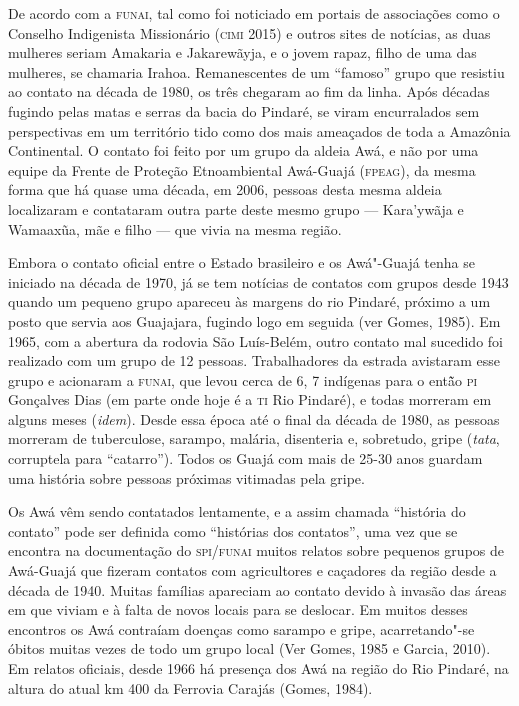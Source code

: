 De acordo com a \textsc{funai}, tal como foi noticiado em portais de associações
como o Conselho Indigenista Missionário (\textsc{cimi} 2015) e outros sites de
notícias, as duas mulheres seriam Amakaria e Jakarewãyja, e o jovem
rapaz, filho de uma das mulheres, se chamaria Irahoa. Remanescentes de
um ``famoso'' grupo que resistiu ao contato na década de 1980, os três
chegaram ao fim da linha. Após décadas fugindo pelas matas e serras da
bacia do Pindaré, se viram encurralados sem perspectivas em um
território tido como dos mais ameaçados de toda a Amazônia Continental.
O contato foi feito por um grupo da aldeia Awá, e não por uma equipe da
Frente de Proteção Etnoambiental Awá-Guajá (\textsc{fpeag}), da mesma forma que
há quase uma década, em 2006, pessoas desta mesma aldeia localizaram e
contataram outra parte deste mesmo grupo --- Kara'ywãja e Wamaaxũa, mãe e
filho --- que vivia na mesma região.

Embora o contato oficial entre o Estado brasileiro e os Awá"-Guajá tenha
se iniciado na década de 1970, já se tem notícias de contatos com grupos
desde 1943 quando um pequeno grupo apareceu às margens do rio Pindaré,
próximo a um posto que servia aos Guajajara, fugindo logo em seguida
(ver Gomes, 1985). Em 1965, com a abertura da rodovia São Luís-Belém,
outro contato mal sucedido foi realizado com um grupo de 12 pessoas.
Trabalhadores da estrada avistaram esse grupo e acionaram a \textsc{funai}, que
levou cerca de 6, 7 indígenas para o entã̃o \textsc{pi} Gonçalves Dias (em parte
onde hoje é a \textsc{ti} Rio Pindaré), e todas morreram em alguns meses (\emph{idem}).
Desde essa época até o final da década de 1980, as pessoas morreram de
tuberculose, sarampo, malária, disenteria e, sobretudo, gripe
(\emph{tata}, corruptela para ``catarro''). Todos os Guajá com mais de
25-30 anos guardam uma história sobre pessoas próximas vitimadas pela
gripe.

Os Awá vêm sendo contatados lentamente, e a assim chamada ``história do
contato'' pode ser definida como ``histórias dos contatos'', uma vez que
se encontra na documentação do \textsc{spi}/\textsc{funai} muitos relatos sobre pequenos
grupos de Awá-Guajá que fizeram contatos com agricultores e caçadores da
região desde a década de 1940. Muitas famílias apareciam ao contato
devido à invasão das áreas em que viviam e à falta de novos locais para
se deslocar. Em muitos desses encontros os Awá contraíam doenças como
sarampo e gripe, acarretando"-se óbitos muitas vezes de todo um grupo
local (Ver Gomes, 1985 e Garcia, 2010). Em relatos oficiais, desde 1966 há
presença dos Awá na região do Rio Pindaré, na altura do atual km 400 da
Ferrovia Carajás (Gomes, 1984).

